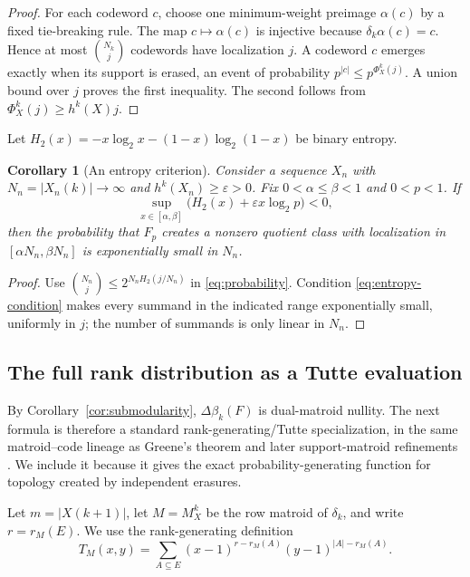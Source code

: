 \documentclass[11pt,letterpaper]{article}
\theoremstyle{plain}
\newtheorem{corollary}[theorem]{Corollary}
\theoremstyle{definition}
\newcommand{\1}{\mathbf{1}}
\newcommand{\abs}[1]{\left|#1\right|}
\begin{document}
\begin{proof}
For each codeword $c$, choose one minimum-weight preimage $\alpha(c)$ by a fixed
tie-breaking rule.  The map $c\mapsto\alpha(c)$ is injective because
$\delta_k\alpha(c)=c$.  Hence at most $\binom{N_k}{j}$ codewords have localization
$j$.  A codeword $c$ emerges exactly when its support is erased, an event of probability
$p^{\abs c}\le p^{\Phi_X^k(j)}$.  A union bound over $j$ proves the first inequality.
The second follows from $\Phi_X^k(j)\ge h^k(X)j$.
\end{proof}

Let $H_2(x)=-x\log_2x-(1-x)\log_2(1-x)$ be binary entropy.

\begin{corollary}[An entropy criterion]\label{cor:entropy}
Consider a sequence $X_n$ with $N_n=\abs{X_n(k)}\to\infty$ and
$h^k(X_n)\ge\varepsilon>0$.  Fix $0<\alpha\le\beta<1$ and $0<p<1$.  If
\begin{equation}\label{eq:entropy-condition}
 \sup_{x\in[\alpha,\beta]}
 \bigl(H_2(x)+\varepsilon x\log_2p\bigr)<0,
\end{equation}
then the probability that $F_p$ creates a nonzero quotient class with localization in
$[\alpha N_n,\beta N_n]$ is exponentially small in $N_n$.
\end{corollary}

\begin{proof}
Use $\binom{N_n}{j}\le2^{N_n H_2(j/N_n)}$ in
\eqref{eq:probability}.  Condition \eqref{eq:entropy-condition} makes every summand in
the indicated range exponentially small, uniformly in $j$; the number of summands is
only linear in $N_n$.
\end{proof}

\subsection{The full rank distribution as a Tutte evaluation}

By Corollary~\ref{cor:submodularity}, $\Delta\beta_k(F)$ is dual-matroid nullity.  The
next formula is therefore a standard rank-generating/Tutte specialization, in the same
matroid--code lineage as Greene's theorem and later support-matroid refinements
\cite{greene1976,barg1997,britz2007}.  We include it because it gives the exact
probability-generating function for topology created by independent erasures.

Let $m=\abs{X(k+1)}$, let $M=M_X^k$ be the row matroid of $\delta_k$, and write
$r=r_M(E)$.  We use the rank-generating definition
\[
 T_M(x,y)=\sum_{A\subseteq E}
 (x-1)^{r-r_M(A)}(y-1)^{\abs A-r_M(A)}.
\]
\end{document}
